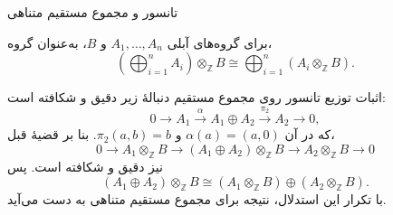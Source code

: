 \begin{frame}[t]{تانسور و مجموع مستقیم متناهی}
    \label{lec19:finite-direct-sum}
    \begin{corollary}
    برای گروه‌های آبلی $A_1,\ldots,A_n$ و $B$، به‌عنوان گروه،
    \[
        \left(\bigoplus_{i=1}^{n}A_i\right)\otimes_{\mathbb Z} B
        \cong
        \bigoplus_{i=1}^{n}(A_i\otimes_{\mathbb Z} B).
    \]
    \end{corollary}
\end{frame}

\begin{frame}[t]{اثبات توزیع تانسور روی مجموع مستقیم}
    \label{lec19:finite-direct-sum-proof}
    دنبالهٔ زیر دقیق و شکافته است:
    \[
        0\longrightarrow A_1\xrightarrow{\alpha}A_1\oplus A_2
        \xrightarrow{\pi_2}A_2\longrightarrow0,
    \]
    که در آن $\alpha(a)=(a,0)$ و $\pi_2(a,b)=b$. بنا بر قضیهٔ قبل،
    \[
        0\longrightarrow A_1\otimes_{\mathbb Z} B
        \longrightarrow(A_1\oplus A_2)\otimes_{\mathbb Z} B
        \longrightarrow A_2\otimes_{\mathbb Z} B\longrightarrow0
    \]
    نیز دقیق و شکافته است. پس
    \[
        (A_1\oplus A_2)\otimes_{\mathbb Z} B
        \cong(A_1\otimes_{\mathbb Z} B)\oplus(A_2\otimes_{\mathbb Z} B).
    \]
    با تکرار این استدلال، نتیجه برای مجموع مستقیم متناهی به دست می‌آید.
\end{frame}
